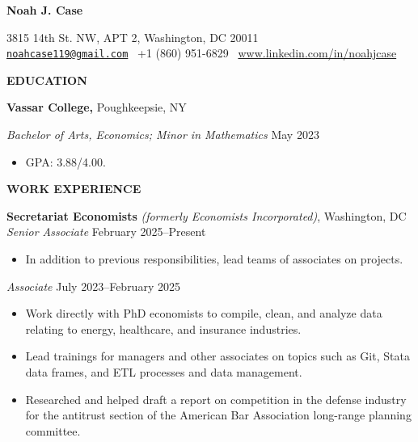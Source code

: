 \documentclass[11pt]{article}
\begin{document}
\pagestyle{empty}
\begin{center}
    \textbf{\Large Noah J. Case}\\ 

    \vspace{1pt}
    
    3815 14th St. NW, APT 2, Washington, DC 20011 \\ \href{mailto:noahcase119@gmail.com}{\texttt{noahcase119@gmail.com}} \textbullet \ +1 (860) 951-6829 \textbullet \ \url{www.linkedin.com/in/noahjcase}
\end{center}

\vspace{-20pt}
\hrulefill
\vspace{-6pt}

\begin{center}
    \textbf{EDUCATION} \\
\end{center}
\textbf{Vassar College,} \hfill Poughkeepsie, NY

\textit{Bachelor of Arts, Economics; Minor in Mathematics} \hfill May 2023
\begin{itemize}[noitemsep, topsep=0pt, partopsep=0pt, parsep=0pt]
    \item GPA: 3.88/4.00.
\end{itemize}

\begin{center}
    \textbf{WORK EXPERIENCE}
\end{center}

\textbf{Secretariat Economists} \textit{(formerly Economists Incorporated)}, \hfill Washington, DC\\
\textit{Senior Associate} \hfill February 2025--Present
\begin{itemize}[noitemsep, topsep=0pt, partopsep=0pt, parsep=0pt]
    \item In addition to previous responsibilities, lead teams of associates on projects.
\end{itemize}
\textit{Associate} \hfill July 2023--February 2025
\begin{itemize}[noitemsep, topsep=0pt, partopsep=0pt, parsep=0pt]
    \item Work directly with PhD economists to compile, clean, and analyze data relating to energy, healthcare, and insurance industries.
    \item Lead trainings for managers and other associates on topics such as Git, Stata data frames, and ETL processes and data management.
    \item Researched and helped draft a report on competition in the defense industry for the antitrust section of the American Bar Association long-range planning committee.
\end{itemize}
\end{document}

